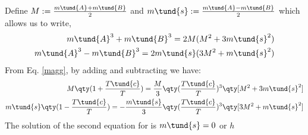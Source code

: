 Define $M := \frac{m\tund{A}+m\tund{B}}{2}$ and $m\tund{s} := \frac{m\tund{A}-m\tund{B}}{2}$ which allows us to write,
\begin{equation}
    \begin{split}
        m\tund{A}^3+m\tund{B}^3 = 2M(M^2 +3m\tund{s}^2)\\
         m\tund{A}^3-m\tund{B}^3 = 2m\tund{s}(3M^2 +m\tund{s}^2)
    \end{split}
\end{equation}
From Eq. \eqref{magg}, by adding and subtracting we have: 
\begin{align}
    \begin{split}
        M\qty(1+\frac{T\tund{c}}{T}) = \frac{M}{3}\qty(\frac{T\tund{c}}{T})^3\qty[M^2+3m\tund{s}^2]\\
        m\tund{s}\qty(1-\frac{T\tund{c}}{T}) = -\frac{m\tund{s}}{3}\qty(\frac{T\tund{c}}{T})^3\qty[3M^2+m\tund{s}^2]
    \end{split}
\end{align}
The solution of the second equation for  is $m\tund{s} =0 $ or $h$